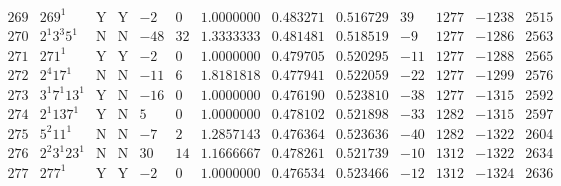 \documentclass[11pt,reqno,a4letter]{article}
\numberwithin{equation}{section}
\numberwithin{figure}{section}
\numberwithin{table}{section}
\theoremstyle{plain}
\numberwithin{theorem}{section}
\theoremstyle{definition}
\begin{document}
\begin{table}[ht]
\begin{equation*}
{\begin{array}{cc|cc|ccc|cc|cccc}
 269 & 269^1 & \text{Y} & \text{Y} & -2 & 0 & 1.0000000 & 0.483271 & 0.516729 & 39 & 1277 & -1238 & 2515 \\
 270 & 2^1 3^3 5^1 & \text{N} & \text{N} & -48 & 32 & 1.3333333 & 0.481481 & 0.518519 & -9 & 1277 & -1286 & 2563 \\
 271 & 271^1 & \text{Y} & \text{Y} & -2 & 0 & 1.0000000 & 0.479705 & 0.520295 & -11 & 1277 & -1288 & 2565 \\
 272 & 2^4 17^1 & \text{N} & \text{N} & -11 & 6 & 1.8181818 & 0.477941 & 0.522059 & -22 & 1277 & -1299 & 2576 \\
 273 & 3^1 7^1 13^1 & \text{Y} & \text{N} & -16 & 0 & 1.0000000 & 0.476190 & 0.523810 & -38 & 1277 & -1315 & 2592 \\
 274 & 2^1 137^1 & \text{Y} & \text{N} & 5 & 0 & 1.0000000 & 0.478102 & 0.521898 & -33 & 1282 & -1315 & 2597 \\
 275 & 5^2 11^1 & \text{N} & \text{N} & -7 & 2 & 1.2857143 & 0.476364 & 0.523636 & -40 & 1282 & -1322 & 2604 \\
 276 & 2^2 3^1 23^1 & \text{N} & \text{N} & 30 & 14 & 1.1666667 & 0.478261 & 0.521739 & -10 & 1312 & -1322 & 2634 \\
 277 & 277^1 & \text{Y} & \text{Y} & -2 & 0 & 1.0000000 & 0.476534 & 0.523466 & -12 & 1312 & -1324 & 2636 \\
\end{array}
}
\end{equation*}
\clearpage 

\end{table} 
\end{document}

